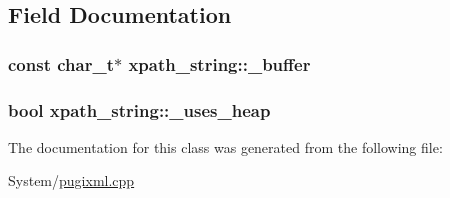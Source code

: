 \subsection{Field Documentation}
\hypertarget{classxpath__string_ad52a80412797ca64bbd1bff527e9d666}{
\subsubsection[{\-\_\-buffer}]{\setlength{\rightskip}{0pt plus 5cm}const char\-\_\-t$\ast$ xpath\-\_\-string\-::\-\_\-buffer\hspace{0.3cm}{\ttfamily [private]}}}\label{classxpath__string_ad52a80412797ca64bbd1bff527e9d666}
\hypertarget{classxpath__string_a67a86f6d1a9cf20b922fc9fb1268d4c1}{
\subsubsection[{\-\_\-uses\-\_\-heap}]{\setlength{\rightskip}{0pt plus 5cm}bool xpath\-\_\-string\-::\-\_\-uses\-\_\-heap\hspace{0.3cm}{\ttfamily [private]}}}\label{classxpath__string_a67a86f6d1a9cf20b922fc9fb1268d4c1}


The documentation for this class was generated from the following file\-:\begin{DoxyCompactItemize}
\item 
System/\hyperlink{pugixml_8cpp}{pugixml.\-cpp}\end{DoxyCompactItemize}
